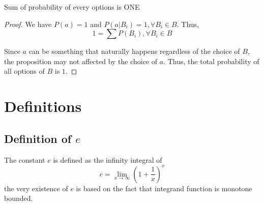 \begin{proposition}
    \label{Proposition: Sum of probability of every options is ONE}
    Sum of probability of every options is ONE

    \begin{proof}
        We have $P(a) = 1$ and $P(a|B_i)=1, \forall B_i \in B$.
        Thus,
        \begin{equation*}
            1 = \sum P(B_i), \forall B_i \in B
        \end{equation*}

        Since $a$ can be something that naturally happens regardless of the choice of $B$, the proposition may not affected by the choice of $a$.
        Thus, the total probability of all options of $B$ is $1$.
    \end{proof}
\end{proposition}

\section{Definitions}

\subsection{Definition of $e$}

The constant $e$ is defined as the infinity integral of
\begin{equation}
    \label{Equation: Definition of e}
    e = \lim_{x \to \infty} (1+\frac{1}{x})^x
\end{equation}
the very existence of $e$ is based on the fact that integrand function is monotone bounded.

